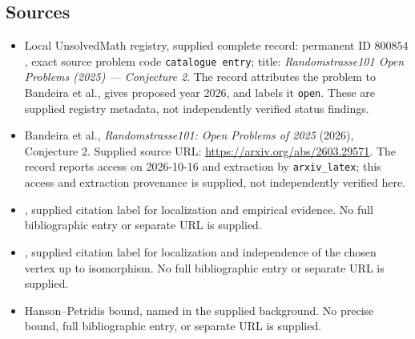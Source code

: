 \documentclass[11pt]{article}
\begin{document}
\subsection{Sources}
\begin{itemize}
\item Local UnsolvedMath registry, supplied complete record: permanent ID \(800854\), exact source problem code \texttt{catalogue entry}; title: \emph{Randomstrasse101 Open Problems (2025) --- Conjecture 2}. The record attributes the problem to Bandeira et al., gives proposed year 2026, and labels it \texttt{open}. These are supplied registry metadata, not independently verified status findings.
\item Bandeira et al., \emph{Randomstrasse101: Open Problems of 2025} (2026), Conjecture 2. Supplied source URL: \url{https://arxiv.org/abs/2603.29571}. The record reports access on 2026-10-16 and extraction by \texttt{arxiv\_latex}; this access and extraction provenance is supplied, not independently verified here.
\item [MMP-2019-LPCliquesPaley], supplied citation label for localization and empirical evidence. No full bibliographic entry or separate URL is supplied.
\item [Kunisky-2023-SpectralPseudorandomnessPaleyClique], supplied citation label for localization and independence of the chosen vertex up to isomorphism. No full bibliographic entry or separate URL is supplied.
\item Hanson--Petridis bound, named in the supplied background. No precise bound, full bibliographic entry, or separate URL is supplied.
\end{itemize}
\end{document}
